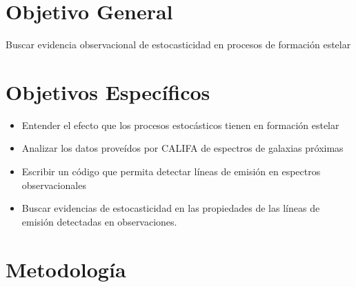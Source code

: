 \documentclass[12pt]{article}
\begin{document}






\section{Objetivo General}

Buscar evidencia observacional de estocasticidad en procesos de
formaci\'on estelar  




\section{Objetivos Espec\'ificos}


\begin{itemize}
	\item Entender el efecto que los procesos estoc\'asticos
          tienen en formaci\'on estelar 
	\item Analizar los datos prove\'idos por CALIFA de espectros
          de galaxias pr\'oximas 
	\item Escribir un c\'odigo que permita detectar l\'ineas de
          emisi\'on en espectros observacionales 
	\item Buscar evidencias de estocasticidad en las propiedades
          de las l\'ineas de emisi\'on detectadas en observaciones.	
\end{itemize}

\section{Metodolog\'ia}
\end{document}
